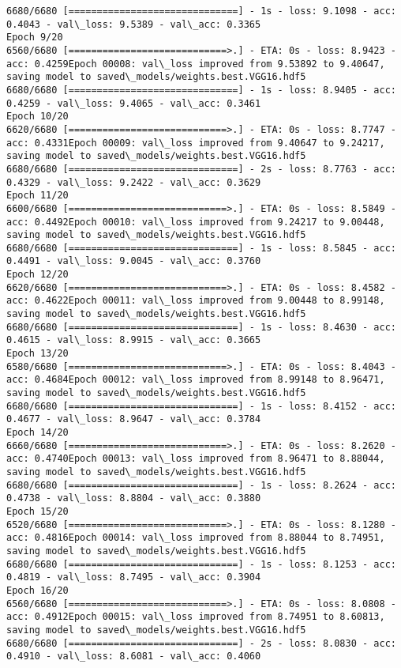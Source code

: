 \documentclass[11pt]{article}
\begin{document}
\begin{Verbatim}[commandchars=\\\{\}]
6680/6680 [==============================] - 1s - loss: 9.1098 - acc: 0.4043 - val\_loss: 9.5389 - val\_acc: 0.3365
Epoch 9/20
6560/6680 [============================>.] - ETA: 0s - loss: 8.9423 - acc: 0.4259Epoch 00008: val\_loss improved from 9.53892 to 9.40647, saving model to saved\_models/weights.best.VGG16.hdf5
6680/6680 [==============================] - 1s - loss: 8.9405 - acc: 0.4259 - val\_loss: 9.4065 - val\_acc: 0.3461
Epoch 10/20
6620/6680 [============================>.] - ETA: 0s - loss: 8.7747 - acc: 0.4331Epoch 00009: val\_loss improved from 9.40647 to 9.24217, saving model to saved\_models/weights.best.VGG16.hdf5
6680/6680 [==============================] - 2s - loss: 8.7763 - acc: 0.4329 - val\_loss: 9.2422 - val\_acc: 0.3629
Epoch 11/20
6600/6680 [============================>.] - ETA: 0s - loss: 8.5849 - acc: 0.4492Epoch 00010: val\_loss improved from 9.24217 to 9.00448, saving model to saved\_models/weights.best.VGG16.hdf5
6680/6680 [==============================] - 1s - loss: 8.5845 - acc: 0.4491 - val\_loss: 9.0045 - val\_acc: 0.3760
Epoch 12/20
6620/6680 [============================>.] - ETA: 0s - loss: 8.4582 - acc: 0.4622Epoch 00011: val\_loss improved from 9.00448 to 8.99148, saving model to saved\_models/weights.best.VGG16.hdf5
6680/6680 [==============================] - 1s - loss: 8.4630 - acc: 0.4615 - val\_loss: 8.9915 - val\_acc: 0.3665
Epoch 13/20
6580/6680 [============================>.] - ETA: 0s - loss: 8.4043 - acc: 0.4684Epoch 00012: val\_loss improved from 8.99148 to 8.96471, saving model to saved\_models/weights.best.VGG16.hdf5
6680/6680 [==============================] - 1s - loss: 8.4152 - acc: 0.4677 - val\_loss: 8.9647 - val\_acc: 0.3784
Epoch 14/20
6660/6680 [============================>.] - ETA: 0s - loss: 8.2620 - acc: 0.4740Epoch 00013: val\_loss improved from 8.96471 to 8.88044, saving model to saved\_models/weights.best.VGG16.hdf5
6680/6680 [==============================] - 1s - loss: 8.2624 - acc: 0.4738 - val\_loss: 8.8804 - val\_acc: 0.3880
Epoch 15/20
6520/6680 [============================>.] - ETA: 0s - loss: 8.1280 - acc: 0.4816Epoch 00014: val\_loss improved from 8.88044 to 8.74951, saving model to saved\_models/weights.best.VGG16.hdf5
6680/6680 [==============================] - 1s - loss: 8.1253 - acc: 0.4819 - val\_loss: 8.7495 - val\_acc: 0.3904
Epoch 16/20
6560/6680 [============================>.] - ETA: 0s - loss: 8.0808 - acc: 0.4912Epoch 00015: val\_loss improved from 8.74951 to 8.60813, saving model to saved\_models/weights.best.VGG16.hdf5
6680/6680 [==============================] - 2s - loss: 8.0830 - acc: 0.4910 - val\_loss: 8.6081 - val\_acc: 0.4060

\end{Verbatim}
\end{document}
